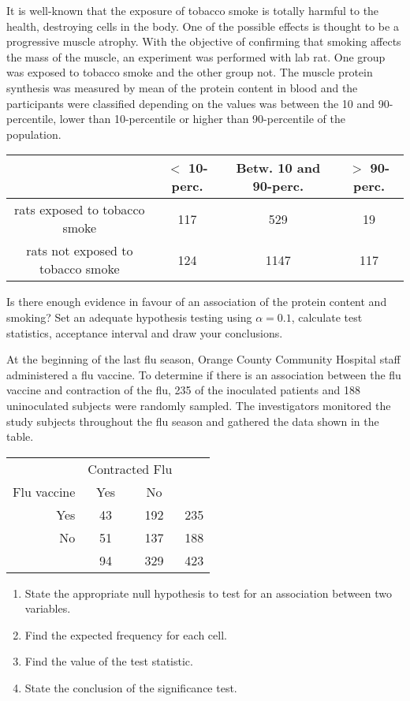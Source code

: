  \begin{problem}
    It is well-known that the exposure of tobacco smoke is totally harmful to the health, destroying cells in the body. One of the possible effects is thought to be  a progressive muscle atrophy. With the objective of confirming that smoking affects the mass of the muscle, an experiment was performed with lab rat. One group was exposed to tobacco smoke and the other group not.  The muscle protein synthesis   was measured  by mean of the protein content in blood and the participants were classified depending on the values was between the 10 and 90-percentile, lower than 10-percentile or higher than 90-percentile of the population.
    \begin{center}
      \begin{tabular}{|c|*{3}{c}|}
 \hline        & $<$ 10-perc. & Betw. 10 and 90-perc. &       $>$ 90-perc. \\ 
 \hline rats exposed to tobacco smoke & 117 & 529 & 19 \\
  rats not exposed to tobacco smoke & 124 & 1147 & 117 \\
\hline  
     \end{tabular}
    \end{center}
Is there enough evidence in favour of an association of the protein content and smoking? Set an adequate hypothesis testing using $\alpha=0.1$, calculate test statistics, acceptance interval and draw your conclusions.   
  \end{problem}
\begin{problem} %
 At the beginning of the last flu season, Orange County Community
 Hospital staff administered a flu vaccine. To determine if there is
 an association between the flu vaccine and contraction of the flu,
 235 of the inoculated patients and 188 uninoculated subjects were
 randomly sampled. The investigators monitored the study subjects
 throughout the flu season and gathered the data shown in the table.

 \begin{center}
   \begin{tabular}{r|cc|l}
      & \multicolumn{2}{c}{Contracted Flu} & \\
\cline{2-3} Flu vaccine & Yes & No & \\
\hline Yes & 43 & 192 & 235 \\
No & 51 & 137 & 188 \\
\hline & 94 & 329 & 423 
   \end{tabular}
 \end{center}
\begin{enumerate}
\item State the appropriate null hypothesis to test for an association between two variables.
\item  Find the expected frequency for each cell.
\item  Find the value of the test statistic.
\item  State the conclusion of the significance test.
\end{enumerate}
\end{problem}
